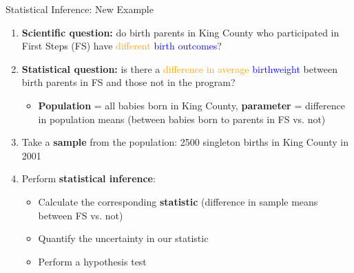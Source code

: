\documentclass[10pt,t]{beamer}
\begin{document}
\begin{frame}{Statistical Inference: New Example}

\begin{enumerate}
	\item \textbf{Scientific question:} do birth parents in King County who participated in First Steps (FS) have \textcolor{orange}{different} \textcolor{blue}{birth outcomes}?
	\item \textbf{Statistical question:} is there a \textcolor{orange}{difference in average} \textcolor{blue}{birthweight} between birth parents in FS and those not in the program?
	\begin{itemize}
		\item \textbf{Population} = all babies born in King County, \textbf{parameter} = difference in population means (between babies born to parents in FS vs. not)
	\end{itemize}
	\item Take a \textbf{sample} from the population: 2500 singleton births in King County in 2001
	\item Perform \textbf{statistical inference}:
	\begin{itemize}
		\item Calculate the corresponding \textbf{statistic} (difference in sample means between FS vs. not)
		\item Quantify the uncertainty in our statistic
		\item Perform a hypothesis test
	\end{itemize}
\end{enumerate}

\end{frame}
\end{document}

